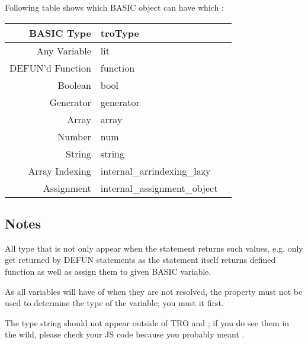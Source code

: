 Following table shows which BASIC object can have which :

\begin{tabulary}{\textwidth}{RLL}
BASIC Type & troType \\
\hline
Any Variable & {\ttfamily lit} \\
DEFUN'd Function & {\ttfamily function} \\
Boolean & {\ttfamily bool} \\
Generator & {\ttfamily generator} \\
Array & {\ttfamily array} \\
Number & {\ttfamily num} \\
String & {\ttfamily string} \\
Array Indexing & {\ttfamily internal\_arrindexing\_lazy} \\
Assignment & {\ttfamily internal\_assignment\_object} \\
\end{tabulary}

\subsection*{Notes}
\begin{itemlist}
\item All type that is not  only appear when the statement returns such values, e.g.  only get returned by DEFUN statements as the statement itself returns defined function as well as assign them to given BASIC variable.
\item As all variables will have  of  when they are not resolved, the property must not be used to determine the type of the variable; you must  it first.
\item The type string  should not appear outside of TRO and ; if you do see them in the wild, please check your JS code because you probably meant .
\end{itemlist}
